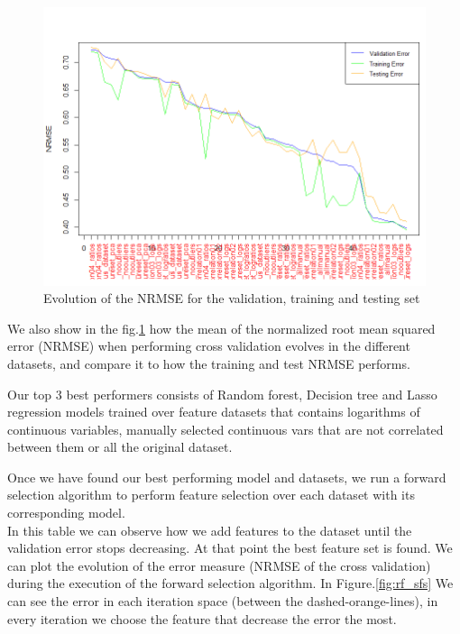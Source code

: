 \begin{figure}[H]
    \centering
        \includegraphics[width=0.95\linewidth]{img/exp01.png}
    \caption{Evolution of the NRMSE for the validation, training and testing set}\label{fig:Evol}
\end{figure}



We also show in the fig.\ref{fig:Evol} how the mean of the normalized root mean squared error (NRMSE) when performing cross validation evolves in the different datasets, and compare it to how the training and test NRMSE performs.






Our top 3 best performers consists of Random forest, Decision tree and Lasso regression models trained over feature datasets that contains logarithms of continuous variables, manually selected continuous vars that are not correlated between them or all the original dataset.


Once we have found our best performing model and datasets, we run a forward selection algorithm to perform feature selection over each dataset with its corresponding model.\\





In this table we can observe how we add features to the dataset until the validation error stops decreasing. At that point the best feature set is found. We can plot the evolution of the error measure (NRMSE of the cross validation) during the execution of the forward selection algorithm. In Figure.\ref{fig:rf_sfs} We can see the error in each iteration space (between the dashed-orange-lines), in every iteration we choose the feature that decrease the error the most.


